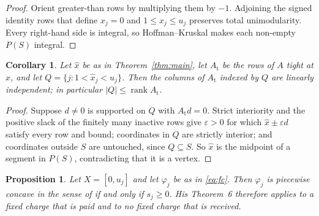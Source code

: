 \documentclass[3p,11pt]{elsarticle}
\newtheorem{proposition}[theorem]{Proposition}
\newtheorem{corollary}[theorem]{Corollary}
\theoremstyle{remark}
\theoremstyle{definition}
\begin{document}
\begin{proof}
Orient greater-than rows by multiplying them by $-1$. Adjoining the signed identity
rows that define $x_j=0$ and $1\le x_j\le u_j$ preserves total unimodularity. Every
right-hand side is integral, so Hoffman--Kruskal makes each non-empty $P(S)$ integral.
\end{proof}

\begin{corollary}\label{cor:count}
Let $\hat x$ be as in Theorem~\ref{thm:main}, let $A_{\mathrm{t}}$ be the rows of $A$
tight at $\hat x$, and let $Q=\{j:1<\hat x_j<u_j\}$. Then the columns of
$A_{\mathrm{t}}$ indexed by $Q$ are linearly independent; in particular
$|Q|\le\operatorname{rank}A_{\mathrm{t}}$.
\end{corollary}

\begin{proof}
Suppose $d\ne0$ is supported on $Q$ with $A_{\mathrm{t}}d=0$. Strict interiority and
the positive slack of the finitely many inactive rows give $\varepsilon>0$ for which
$\hat x\pm\varepsilon d$ satisfy every row and bound; coordinates in $Q$ are strictly
interior; and coordinates outside $S$ are untouched, since $Q\subseteq S$. So $\hat x$
is the midpoint of a segment in $P(S)$, contradicting that it is a vertex.
\end{proof}

\begin{proposition}\label{prop:zangwill}
Let $X=[0,u_j]$ and let $\varphi_j$ be as in \eqref{eq:fc}. Then $\varphi_j$ is piecewise
concave in the sense of \cite{zangwill67} \emph{if and only if} $s_j\ge0$. His Theorem~6
therefore applies to a fixed charge that is paid and to no fixed charge that is received.
\end{proposition}
\end{document}
